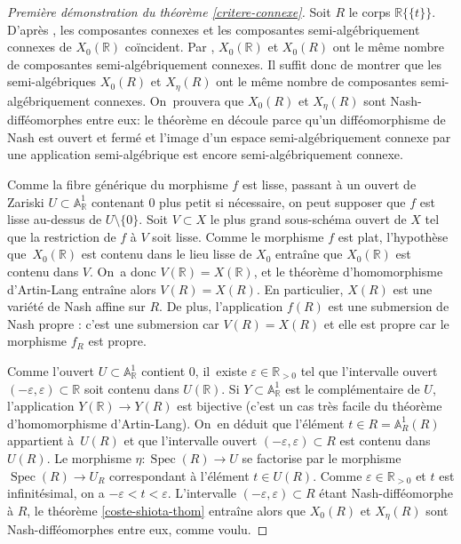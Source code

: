 \documentclass[JEP,XML,SOM,Unicode,francais,published]{cedram}
\let\epsilon\varepsilon
\theoremstyle{definition}
\newcommand{\R}{\mathbb R}
\newcommand{\A}{\mathbb A}
\newcommand{\puiseux}{\mathbb{R}\{\!\{t\}\!\}}
\begin{document}
\begin{proof}[Première démonstration du théorème \ref{critere-connexe}]
Soit $R$ le corps $\puiseux$. D'après \cite[Th.\,2.4.5]{bochnak1987geometrie}, les composantes connexes et les composantes semi-algébriquement connexes de $X_0(\R)$ coïncident. Par \cite[Prop.\,5.3.6]{bochnak1998real}, $X_0(\R)$ et $X_0(R)$ ont le même nombre de composantes semi-algébriquement connexes. Il suffit donc de montrer que les semi-algébriques $X_0(R)$ et $X_\eta(R)$ ont le même nombre de composantes semi-algébriquement connexes. On~prouvera que $X_0(R)$ et $X_\eta(R)$ sont Nash-difféomorphes entre eux: le théorème en découle parce qu'un difféomorphisme de Nash est ouvert et fermé et l'image d'un espace semi-algébriquement connexe par une application semi-algébrique est encore semi-algébriquement connexe.

Comme la fibre générique du morphisme $f$ est lisse, passant à un ouvert de Zariski $U\subset \A^1_{\R}$ contenant $0$ plus petit si nécessaire, on peut supposer que $f$ est lisse au-dessus de $U\setminus\{0\}$. Soit $V\subset X$ le plus grand sous-schéma ouvert de $X$ tel que la restriction de $f$ à $V$ soit lisse. Comme le morphisme $f$ est plat, l'hypothèse que~$X_0(\R)$ est contenu dans le lieu lisse de $X_0$ entraîne que $X_0(\R)$ est contenu dans $V$. On~a donc $V(\R)=X(\R)$, et le théorème d'homomorphisme d'Artin-Lang \cite[Th.\,4.1.2]{bochnak1998real} entraîne alors $V(R)=X(R)$. En particulier, $X(R)$ est une variété de Nash affine sur $R$.
De plus, l'application $f(R)$ est une submersion de Nash propre : c'est une submersion car $V(R)=X(R)$ et elle est propre car le morphisme $f_R$ est propre.

Comme l'ouvert $U\subset \A^1_{\R}$ contient $0$, il~existe $\epsilon\in \R_{>0}$ tel que l'intervalle ouvert $(-\epsilon,\epsilon)\subset \R$ soit contenu dans $U(\R)$. Si $Y\subset \A^1_{\R}$ est le complémentaire de $U$, l'appli\-cation $Y(\R)\to Y(R)$ est bijective (c'est un cas très facile du théorème d'homomorphisme d'Artin-Lang). On~en déduit que l'élément $t\in R=\A^1_R(R)$ appartient à~$U(R)$ et que l'intervalle ouvert $(-\epsilon,\epsilon)\subset R$ est contenu dans $U(R)$. Le morphisme $\eta\colon \operatorname{Spec}(R) \to U$ se factorise par le morphisme $\operatorname{Spec}(R) \to U_R$ correspondant à l'élément $t\in U(R)$. Comme $\epsilon\in \R_{>0}$ et $t$ est infinitésimal, on a $-\epsilon < t<\epsilon$. L'intervalle $(-\epsilon,\epsilon)\subset R$ étant Nash-difféomorphe à $R$, le théorème \ref{coste-shiota-thom} entraîne alors que $X_0(R)$ et $X_\eta(R)$ sont Nash-difféomorphes entre eux, comme voulu.
\end{proof}
\end{document}
